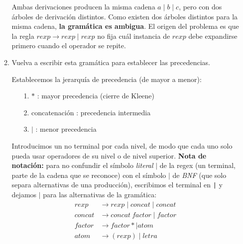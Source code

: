 \documentclass[12pt,letterpaper]{article}
\begin{document}
\begin{enumerate}[label=\arabic*.]
\begin{enumerate}[label=\alph*.]
    Ambas derivaciones producen la misma cadena $a\mid b\mid c$, pero con dos árboles de derivación distintos.
    Como existen dos árboles distintos para la misma cadena, \textbf{la gramática es ambigua}.
    El origen del problema es que la regla $rexp \to rexp\mid rexp$ no fija cuál instancia de
    $rexp$ debe expandirse primero cuando el operador se repite.

  \item Vuelva a escribir esta gramática para establecer las precedencias.

    Establecemos la jerarquía de precedencia (de mayor a menor):
    \begin{enumerate}
    \item[1.] $*$\; : mayor precedencia (cierre de Kleene)
    \item[2.] concatenación\; : precedencia intermedia
    \item[3.] $\mid$\; : menor precedencia
    \end{enumerate}

    Introducimos un no terminal por cada nivel, de modo que cada uno solo pueda usar
    operadores de su nivel o de nivel superior. \textbf{Nota de notación:} para no confundir
    el símbolo \emph{literal} $\mid$ de la regex (un terminal, parte de la cadena que se
    reconoce) con el símbolo $\mid$ de \emph{BNF} (que solo separa alternativas de una
    producción), escribimos el terminal en \texttt{|} y dejamos $\mid$ para las alternativas
    de la gramática:
    \[
    \begin{aligned}
      rexp &\to rexp \;\texttt{|}\; concat \mid concat \\
      concat &\to concat\ factor \mid factor \\
      factor &\to factor * \mid atom \\
      atom &\to (rexp) \mid letra
    \end{aligned}
    \]


\end{enumerate}
\end{enumerate}
\end{document}
